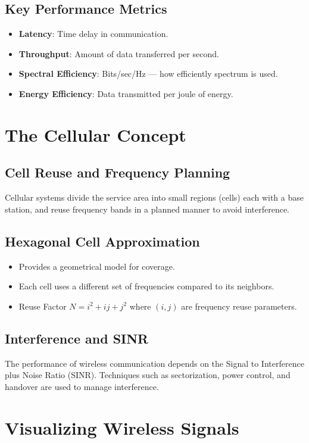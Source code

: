 \subsection{Key Performance Metrics}
\begin{itemize}
    \item \textbf{Latency}: Time delay in communication.
    \item \textbf{Throughput}: Amount of data transferred per second.
    \item \textbf{Spectral Efficiency}: Bits/sec/Hz — how efficiently spectrum is used.
    \item \textbf{Energy Efficiency}: Data transmitted per joule of energy.
\end{itemize}

\section{The Cellular Concept}

\subsection{Cell Reuse and Frequency Planning}
Cellular systems divide the service area into small regions (cells) each with a base station, and reuse frequency bands in a planned manner to avoid interference.

\subsection{Hexagonal Cell Approximation}
\begin{itemize}
    \item Provides a geometrical model for coverage.
    \item Each cell uses a different set of frequencies compared to its neighbors.
    \item Reuse Factor $N = i^2 + ij + j^2$ where $(i,j)$ are frequency reuse parameters.
\end{itemize}

\subsection{Interference and SINR}
The performance of wireless communication depends on the Signal to Interference plus Noise Ratio (SINR). Techniques such as sectorization, power control, and handover are used to manage interference.

\section{Visualizing Wireless Signals}

